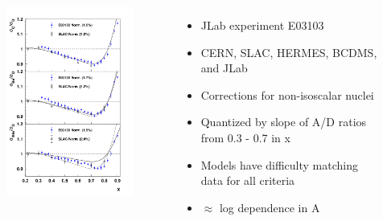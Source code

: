 \documentclass[12pt,usenames,dvipsnames]{beamer}
\begin{document}
\begin{frame}
\begin{columns}
\vspace{-20pt}
\begin{figure}
	\includegraphics[width=6cm]{../images/carbon_be_he4}
\end{figure}

	\begin{itemize}
		\item<1-> JLab experiment E03103 \cite{E3103} 
		\item<2-> CERN, SLAC, HERMES, BCDMS, and JLab
		\item<3-> Corrections for non-isoscalar nuclei
		\item<4-> Quantized by slope of A/D ratios from 0.3 - 0.7 in x
		\item<5-> Models have difficulty matching data for all criteria
		\item<6-> $\approx$ log dependence in A
	\end{itemize}

\end{columns}
\end{frame}
\end{document}
